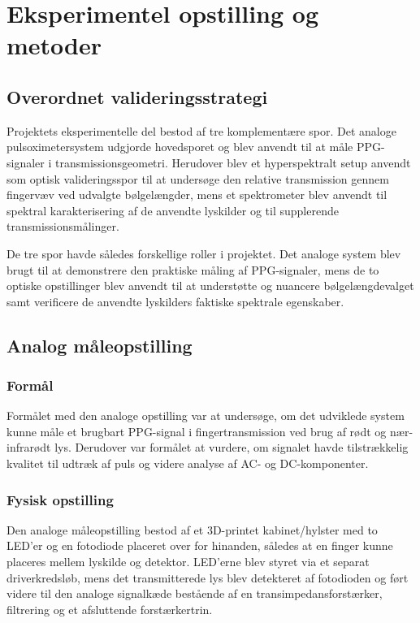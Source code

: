 \chapter{Eksperimentel opstilling og metoder}
\label{chap:methods}

\section{Overordnet valideringsstrategi}
Projektets eksperimentelle del bestod af tre komplementære spor. Det analoge pulsoximetersystem udgjorde hovedsporet og blev anvendt til at måle PPG-signaler i transmissionsgeometri. Herudover blev et hyperspektralt setup anvendt som optisk valideringsspor til at undersøge den relative transmission gennem fingervæv ved udvalgte bølgelængder, mens et spektrometer blev anvendt til spektral karakterisering af de anvendte lyskilder og til supplerende transmissionsmålinger.

De tre spor havde således forskellige roller i projektet. Det analoge system blev brugt til at demonstrere den praktiske måling af PPG-signaler, mens de to optiske opstillinger blev anvendt til at understøtte og nuancere bølgelængdevalget samt verificere de anvendte lyskilders faktiske spektrale egenskaber.

\section{Analog måleopstilling}
\label{sec:analog_setup}

\subsection{Formål}
Formålet med den analoge opstilling var at undersøge, om det udviklede system kunne måle et brugbart PPG-signal i fingertransmission ved brug af rødt og nær-infrarødt lys. Derudover var formålet at vurdere, om signalet havde tilstrækkelig kvalitet til udtræk af puls og videre analyse af AC- og DC-komponenter.

\subsection{Fysisk opstilling}
Den analoge måleopstilling bestod af et 3D-printet kabinet/hylster med to LED'er og en fotodiode placeret over for hinanden, således at en finger kunne placeres mellem lyskilde og detektor. LED'erne blev styret via et separat driverkredsløb, mens det transmitterede lys blev detekteret af fotodioden og ført videre til den analoge signalkæde bestående af en transimpedansforstærker, filtrering og et afsluttende forstærkertrin.

